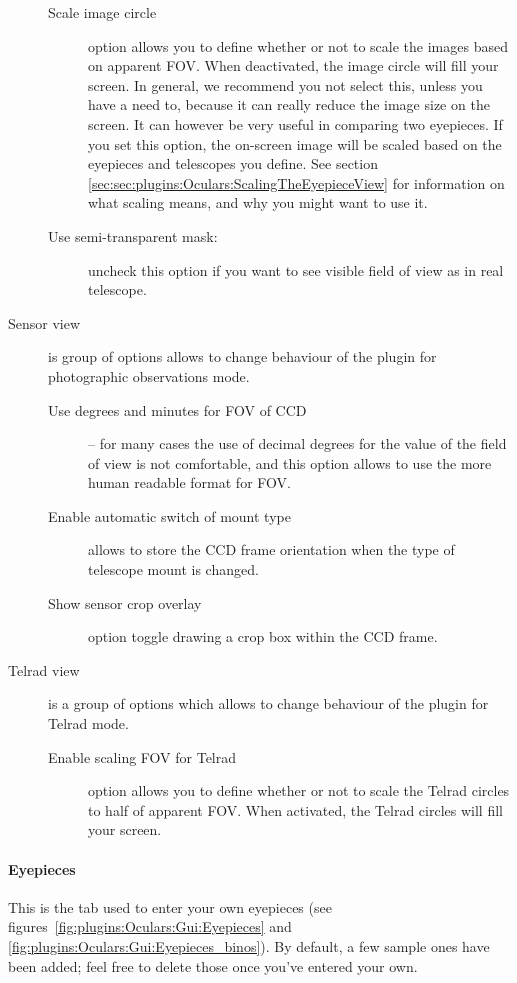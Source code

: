 \begin{description}
\begin{description}
   \item[Scale image circle] option allows you to define whether or not to scale the images based on apparent FOV. When deactivated, the image circle will fill your screen. 
         In general, we recommend you not select this, unless you have a need to, because it can really reduce the image size on the screen. 
		 It can however be very useful in comparing two eyepieces. 
		 If you set this option, the  on-screen image will be scaled based on the eyepieces and telescopes you define. 
		 See section \ref{sec:sec:plugins:Oculars:ScalingTheEyepieceView} for information on what scaling means, and why you might want to use it.
   \item[Use semi-transparent mask:] uncheck this option if you want to see visible field of view as in real telescope.
 \end{description}
\item[Sensor view] is group of options allows to change behaviour of the plugin for photographic observations mode.
 \begin{description}
   \item[Use degrees and minutes for FOV of CCD] -- for many cases the use of decimal degrees for the value of the field of view is not comfortable, and this option allows to use the more human readable format for FOV.
   \item[Enable automatic switch of mount type] allows to store the CCD frame orientation when the type of telescope mount is changed.
   \item[Show sensor crop overlay] option toggle drawing a crop box within the CCD frame.
 \end{description}
\item[Telrad view] is a group of options which allows to change behaviour of the plugin for Telrad mode.
 \begin{description}
 \item[Enable scaling FOV for Telrad] option allows you to define whether or not to scale the Telrad circles to half of apparent FOV.
   When activated, the Telrad circles will fill your screen. 
 \end{description}
\end{description}

\paragraph{Eyepieces}

This is the tab used to enter your own eyepieces (see figures~\ref{fig:plugins:Oculars:Gui:Eyepieces} and \ref{fig:plugins:Oculars:Gui:Eyepieces_binos}). 
By default, a few sample ones have been added; feel free to delete those once you've entered your own.

